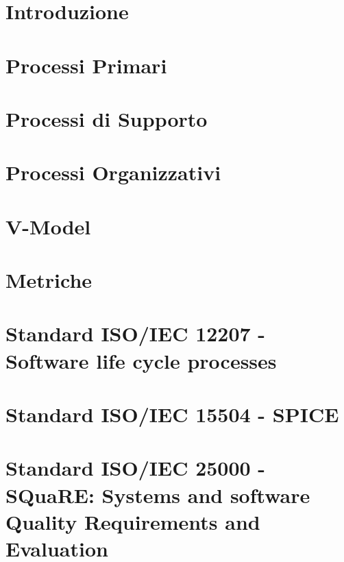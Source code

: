 \documentclass{classes/base}
\begin{document}
	\newpage
	
	\newpage
	\tableofcontents
	\newpage
	\listoftables

	\newpage
	\section{Introduzione}
	
	
	\newpage
	\section{Processi Primari}
	
	
	\newpage
	\section{Processi di Supporto}
	
	
	\newpage
	\section{Processi Organizzativi}
	

	\newpage
	\section{V-Model}
	
	
	\newpage
	\section{Metriche}
	
	
	\newpage
	\section{Standard ISO/IEC 12207 - Software life cycle processes}
	
	
	\newpage
	\section{Standard ISO/IEC 15504 - SPICE}
	
	
	\newpage
	\section{Standard ISO/IEC 25000 - SQuaRE: Systems and software Quality
		Requirements and Evaluation} %
	
	
\end{document}

